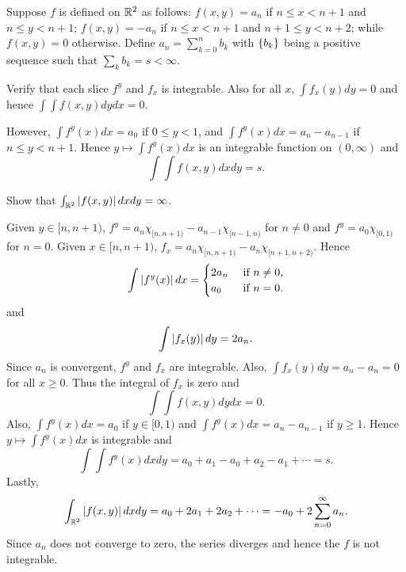 \begin{exercise}
    Suppose $f$ is defined on $\mathbb{R}^2$ as follows: $f(x,y) = a_n$ if $n\leq x <n+1$ 
    and $n\leq y < n+1$; $f(x,y) = -a_n$ if $n\leq x < n+1$ and $n+1\leq y < n+2$; 
    while $f(x,y) = 0$ otherwise. Define $a_n = \sum_{k=0}^{n} b_k$ with $\left\{ {b_k} \right\}$ 
    being a positive sequence such that $\sum_k b_k = s <\infty$.
    \begin{thmenum}
        \item Verify that each slice $f^y$ and $f_x$ is integrable. Also for all 
        $x$, $\int f_x(y)dy = 0$ and hence $\int\int f(x,y)dydx = 0$.
        \item However, $\int f^y(x)dx = a_0$ if $0\leq y<1$, and $\int f^y(x)dx 
        = a_n - a_{n-1}$ if $n\leq y < n+1$. Hence $y\mapsto \int f^y(x)dx$ is an 
        integrable function on $(0,\infty)$ and 
        \begin{equation*}
            \int\int f(x,y)dxdy = s.
        \end{equation*}
        \item Show that $\int_{\mathbb{R}^2} \left\lvert {f(x,y)} \right\rvert dxdy = \infty$.
    \end{thmenum} 
\end{exercise}
\begin{pf}
    Given $y\in[n,n+1)$, $f^y = a_n\chi_{[n,n+1)} - a_{n-1}\chi_{[n-1,n)}$ for $n\neq 0$ 
    and $f^y = a_0\chi_{[0,1)}$ for $n=0$. Given $x\in[n,n+1)$, 
    $f_x = a_n\chi_{[n,n+1)} - a_n\chi_{[n+1,n+2)}$. Hence 
    \begin{equation*}
        \int \left\lvert {f^y(x)} \right\rvert dx = \begin{cases}
            2a_n & \text{ if $n\neq 0$,} \\
            a_0 & \text{ if $n=0$.}
        \end{cases}
    \end{equation*} 
    and 
    \begin{equation*}
        \int \left\lvert {f_x(y)} \right\rvert dy = 2a_n.
    \end{equation*}
    Since $a_n$ is convergent, $f^y$ and $f_x$ are integrable. Also, 
    $\int f_x(y)dy = a_n - a_n = 0$ for all $x\geq 0$. Thus the integral 
    of $f_x$ is zero and 
    \begin{equation*}
        \int\int f(x,y)dydx = 0.
    \end{equation*} 
    Also, $\int f^y(x)dx = a_0$ if $y\in[0,1)$ and $\int f^y(x)dx = a_n - a_{n-1}$ 
    if $y\geq 1$. Hence $y\mapsto\int f^y(x)dx$ is integrable and 
    \begin{equation*}
        \int\int f^y(x)dxdy = a_0 + a_1 - a_0 + a_2 - a_1 + \cdots = s.
    \end{equation*} 
    Lastly, 
    \begin{equation*}
        \int_{\mathbb{R}^2} \left\lvert {f(x,y)} \right\rvert dxdy = a_0 + 2a_1 + 2a_2 + \cdots 
        = -a_0 + 2\sum_{n=0}^{\infty}a_n.
    \end{equation*}
    Since $a_n$ does not converge to zero, the series diverges and hence 
    the $f$ is not integrable.
\end{pf}

